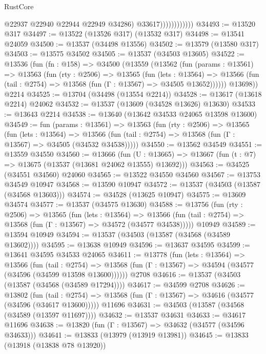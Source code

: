 \begin{lexlean}{RustCore}
\begin{coremodule}
                              @22937
                              @22940
                              @22944
                              @22949
                              @34286)
                            @33617))))))))))))
@34493 := @13520 @317
@34497 := @13522 (@13526 @317) (@13532 @317)
@34498 := @13541 @24059
@34500 := @13537 (@34498 @13556)
@34502 := @13579 (@13580 @317)
@34503 := @13575 @34502
@34505 := @13537 (@34503 @13605)
@34522 := @13536
    (fun (fn : @158) =>
    @34500
      (@13559
        (@13562
          (fun (params : @13561) =>
          @13563
            (fun (rty : @2506) =>
            @13565
              (fun (lets : @13564) =>
              @13566 (fun (tail : @2754) => @13568 (fun (Γ : @13567) => @34505 @13652))))))
        @13698))
    @2214
@34525 := @13704 (@34498 (@13554 @2214))
@34528 := @13617 (@13618 @2214) @24062
@34532 := @13537 (@13609 (@34528 @13626) @13630)
@34533 := @13643 @2214
@34538 := @13640 (@13642 @34533 @24065 @13598 @13600)
@34549 := fun (params : @13561) =>
  @13563
    (fun (rty : @2506) =>
    @13565
      (fun (lets : @13564) =>
      @13566 (fun (tail : @2754) => @13568 (fun (Γ : @13567) => @34505 (@34532 @34538)))))
@34550 := @13562 @34549
@34551 := @13559 @34550
@34560 := @13666
    (fun (U : @13665) => @13667 (fun (t : @7) => @13675 (@13537 (@13681 @24062 @13555) @13692)))
@34563 := @34525 (@34551 @34560) @24060
@34565 := @13522 @34550 @34560
@34567 := @13753 @34549 @10947
@34568 := @13590 @10947
@34572 := @13537 (@34503 (@13587 (@34568 @13603)))
@34574 := @34528 (@13625 @10947)
@34575 := @13609 @34574
@34577 := @13537 (@34575 @13630)
@34588 := @13756
    (fun (rty : @2506) =>
    @13565
      (fun (lets : @13564) =>
      @13566 (fun (tail : @2754) => @13568 (fun (Γ : @13567) => @34572 (@34577 @34538)))))
    @10949
@34589 := @13594 @10949
@34594 := @13537 (@34503 (@13587 (@34568 (@34589 @13602))))
@34595 := @13638 @10949
@34596 := @13637 @34595
@34599 := @13641 @34595 @34533 @24065
@34611 := @13778
    (fun (lets : @13564) =>
    @13566
      (fun (tail : @2754) =>
      @13568 (fun (Γ : @13567) => @34594 (@34577 (@34596 (@34599 @13598 @13600))))))
    @2708
@34616 := @13537 (@34503 (@13587 (@34568 (@34589 @17294))))
@34617 := @34599 @2708
@34626 := @13802
    (fun (tail : @2754) => @13568 (fun (Γ : @13567) => @34616 (@34577 (@34596 (@34617 @13600)))))
    @11696
@34631 := @34503 (@13587 (@34568 (@34589 (@13597 @11697))))
@34632 := @13537 @34631
@34633 := @34617 @11696
@34638 := @13820 (fun (Γ : @13567) => @34632 (@34577 (@34596 @34633)))
@34641 := @13833 (@13979 (@13919 @13981))
@34645 := @13833 (@13918 (@13838 @78 @13920))

\end{coremodule}
\end{lexlean}
